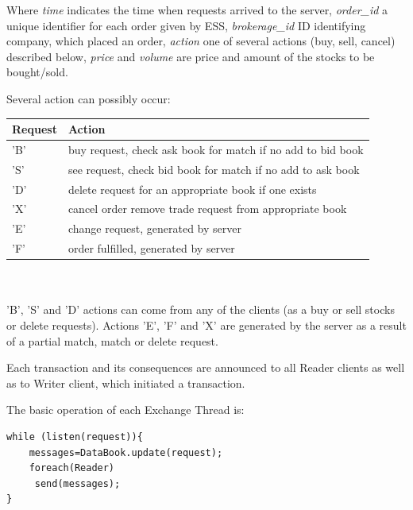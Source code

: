 \documentclass[14pt]{article}
\begin{document}
Where \emph{time} indicates the time when requests arrived to the server, \emph{order\_id} a unique identifier for each order given by ESS, \emph{brokerage\_id} ID identifying company, which placed an order, \emph{action} one of several actions (buy, sell, cancel) described below, \emph{price} and \emph{volume} are price and amount of the stocks to be bought/sold. 

\noindent Several action can possibly occur:

\begin{tabular}{|l|l|}
  \hline
  Request & Action \\ \hline
  'B' & buy request, check ask book for match if no add to bid book \\ \hline
  'S' & see request, check bid book for match if no add to ask book \\ \hline
  'D' & delete request for an appropriate book if one exists \\ \hline
  'X' & cancel order remove trade request from appropriate book\\ \hline
  'E' & change request, generated by server \\ \hline
  'F' & order fulfilled, generated by server \\
  \hline
\end{tabular}
\\
\\
\noindent 'B', 'S' and 'D' actions can come from any of the clients (as a buy or sell stocks or delete requests). Actions 'E', 'F' and 'X' are generated by the server as a result of a partial match, match or delete request. 

Each transaction and its consequences are announced to all Reader clients as well as to Writer client, which initiated a transaction. 

The basic operation of each Exchange Thread is:

\begin{verbatim}
while (listen(request)){
	messages=DataBook.update(request);
	foreach(Reader)
	 send(messages);
}
\end{verbatim}

\end{document}
